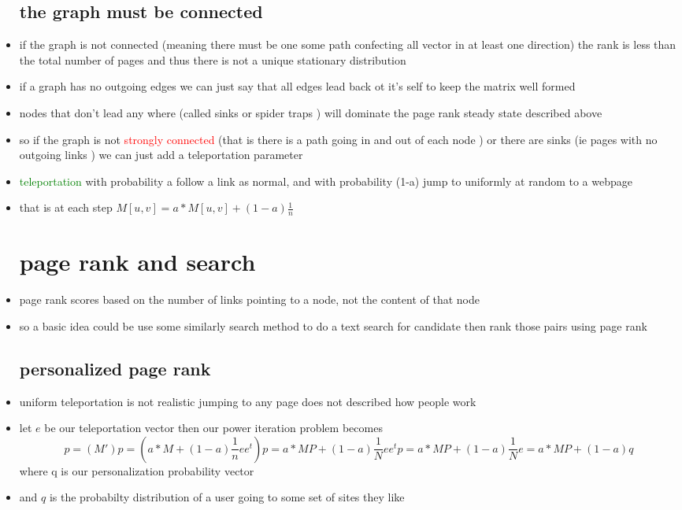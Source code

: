 \documentclass{article}
\begin{document}
\begin{itemize}
\subsection*{the graph must be connected}
\item if the graph is not connected (meaning there must be one some path confecting all vector in at least one direction) the rank is less than the total number of pages and thus there is not a unique stationary distribution
\item if a graph has no outgoing edges we can just say that all edges lead back ot it's self to keep the matrix well formed 
\item nodes that don't lead any where (called sinks or spider traps ) will dominate the page rank steady state described above
\item so if the graph is not \textcolor{red}{strongly connected} (that is there is a path going  in and out of each node ) or there are sinks (ie pages with no outgoing links ) we can just add a teleportation parameter
\item \textcolor{green}{teleportation} with probability a follow a link as normal, and with probability (1-a) jump to uniformly at random to a webpage 
\item that is at each step $M[u,v]=a*M[u,v]+(1-a)\frac{1}{n}$
\section*{page rank and search }
\item page rank scores based on the number of links pointing to a node, not the content of that node 
\item so a basic idea could be use some similarly search method to do a text search for candidate then rank those pairs using page rank 
\subsection*{personalized page rank}
\item uniform teleportation is not realistic jumping to any page does not described how people work 
\item let $e$ be our teleportation vector then our power iteration problem becomes $$p=(M')p=(a*M+(1-a)\frac{1}{n}ee^t)p = a*MP+(1-a)\frac{1}{N}ee^tp=a*MP+(1-a)\frac{1}{N}e=a*MP+(1-a)q$$ where q is our personalization probability vector  
\item and $q$ is the probabilty distribution of a user going to some set of sites they like 

\end{itemize}
\end{document}
